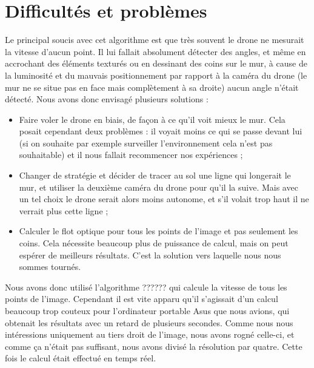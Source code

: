 \documentclass[titlepage,11pt,a4paper]{article}
\begin{document}
\section{Difficultés et problèmes}
Le principal soucis avec cet algorithme est que très souvent le drone ne mesurait la vitesse d'aucun point. Il lui fallait absolument détecter des angles, et même en accrochant des éléments texturés ou en dessinant des coins sur le mur, à cause de la luminosité et du mauvais positionnement par rapport à la caméra du drone (le mur ne se situe pas en face mais complètement à sa droite) aucun angle n'était détecté. Nous avons donc envisagé plusieurs solutions :
\begin{itemize}
	\item Faire voler le drone en biais, de façon à ce qu'il voit mieux le mur. Cela posait cependant deux problèmes : il voyait moins ce qui se passe devant lui (si on souhaite par exemple surveiller l'environnement cela n'est pas souhaitable) et il nous fallait recommencer nos expériences ;
	\item Changer de stratégie et décider de tracer au sol une ligne qui longerait le mur, et utiliser la deuxième caméra du drone pour qu'il la suive. Mais avec un tel choix le drone serait alors moins autonome, et s'il volait trop haut il ne verrait plus cette ligne ;
	\item Calculer le flot optique pour tous les points de l'image et pas seulement les coins. Cela nécessite beaucoup plus de puissance de calcul, mais on peut espérer de meilleurs résultats. C'est la solution vers laquelle nous nous sommes tournés.
\end{itemize}

Nous avons donc utilisé l'algorithme ?????? qui calcule la vitesse de tous les points de l'image. Cependant il est vite apparu qu'il s'agissait d'un calcul beaucoup trop couteux pour l'ordinateur portable Asus que nous avions, qui obtenait les résultats avec un retard de plusieurs secondes. Comme nous nous intéressions uniquement au tiers droit de l'image, nous avons rogné celle-ci, et comme ça n'était pas suffisant, nous avons divisé la résolution par quatre. Cette fois le calcul était effectué en temps réel.
\end{document}
